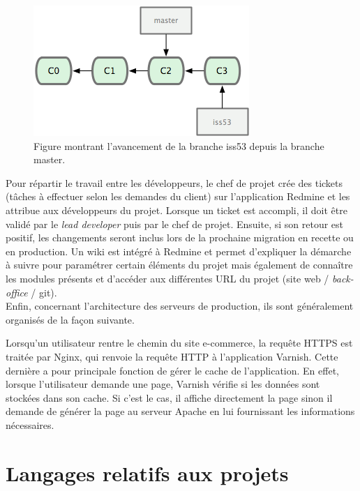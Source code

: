 \documentclass[12pt, a4paper, twoside]{report}
\begin{document}
\begin{figure}[H]
	\centerline{\includegraphics[scale=0.5]{Images/image.png}}
	\caption{Figure montrant l'avancement de la branche iss53 depuis la branche master.}
\end{figure}

Pour répartir le travail entre les développeurs, le chef de projet crée des tickets (tâches à effectuer selon les demandes du client) sur l'application Redmine et les attribue aux développeurs du projet. Lorsque un ticket est accompli, il doit être validé par le \textit{lead developer} puis par le chef de projet. Ensuite, si son retour est positif, les changements seront inclus lors de la prochaine migration en recette ou en production. Un wiki est intégré à Redmine et permet d'expliquer la démarche à suivre pour paramétrer certain éléments du projet mais également de connaître les modules présents et d'accéder aux différentes URL du projet (site web / \textit{back-office} / git). \\

Enfin, concernant l'architecture des serveurs de production, ils sont généralement organisés de la façon suivante.

	 \par
	
Lorsqu'un utilisateur rentre le chemin du site e-commerce, la requête HTTPS est traitée par Nginx, qui renvoie la requête HTTP à l'application Varnish. Cette dernière a pour principale fonction de gérer le cache de l'application. En effet, lorsque l'utilisateur demande une page, Varnish vérifie si les données sont stockées dans son cache. Si c'est le cas, il affiche directement la page sinon il demande de générer la page au serveur Apache en lui fournissant les informations nécessaires.
	

\section{Langages relatifs aux projets}
\end{document}
